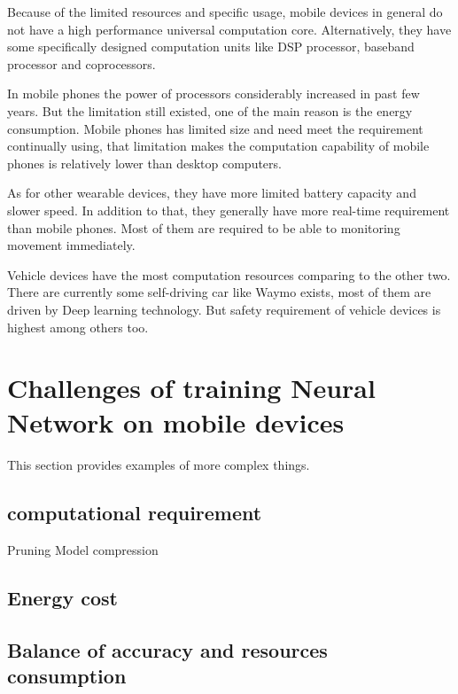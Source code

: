 \documentclass[article]{aaltoseries}
\begin{document}
Because of the limited resources and specific usage, mobile devices in general do not have a high performance 
universal computation core. Alternatively, they have some specifically designed computation units like DSP processor,
baseband processor and coprocessors.

In mobile phones the power of processors considerably increased in past few years. But the limitation still existed, 
one of the main reason is the energy consumption. Mobile phones has limited size and need meet the requirement continually
using, that limitation makes the computation capability of mobile phones is relatively lower than desktop computers.

As for other wearable devices, they have more limited battery capacity and slower speed. In addition to that, 
they generally have more real-time requirement than mobile phones. Most of them are required to be able to monitoring
movement immediately.

Vehicle devices have the most computation resources comparing to the other two. There are currently some self-driving
car like Waymo exists, most of them are driven by Deep learning technology. But safety requirement of vehicle devices
is highest among others too.  








\section{Challenges of training Neural Network on mobile devices}

This section provides examples of more complex things.




\subsection{computational requirement}
Pruning
Model compression

\subsection{Energy cost}

\subsection{Balance of accuracy and resources consumption}
\end{document}
